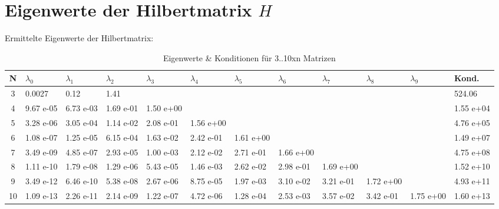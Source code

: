 \documentclass{beamer}
\begin{document}
  \section{Eigenwerte der Hilbertmatrix $H$}
  \begin{frame}
    Ermittelte Eigenwerte der Hilbertmatrix:
    \centering    
    \begin{table}[htbp]
    \tiny   
    \begin{tabularx}{\textwidth}{|c|X|X|X|X|X|X|X|X|X|X|X|}
        \hline    
        N & $\lambda_0$&$\lambda_1$&$\lambda_2$&$\lambda_3$&$\lambda_4$&$\lambda_5$&$\lambda_6$&$\lambda_7$&$\lambda_8$&$\lambda_9$& Kond.\\\hline
        3 & 0.0027 & 0.12 & 1.41 &&&&&&&& 524.06\\\hline
        4 & 9.67 e-05 & 6.73 e-03 & 1.69 e-01 & 1.50 e+00 &&&&&&& 1.55 e+04\\\hline
        5 & 3.28 e-06 & 3.05 e-04 & 1.14 e-02 & 2.08 e-01 & 1.56 e+00 &&&&&& 4.76 e+05\\\hline
        6 & 1.08 e-07 & 1.25 e-05 & 6.15 e-04 & 1.63 e-02 & 2.42 e-01 & 1.61 e+00 &&&&& 1.49 e+07\\\hline
        7 & 3.49 e-09 & 4.85 e-07 & 2.93 e-05 & 1.00 e-03 & 2.12 e-02 & 2.71 e-01 & 1.66 e+00 &&&& 4.75 e+08\\\hline
        8 & 1.11 e-10 & 1.79 e-08 & 1.29 e-06 & 5.43 e-05 & 1.46 e-03 & 2.62 e-02 & 2.98 e-01 & 1.69 e+00 &&& 1.52 e+10\\\hline
        9 & 3.49 e-12 & 6.46 e-10 & 5.38 e-08 & 2.67 e-06 & 8.75 e-05 & 1.97 e-03 & 3.10 e-02 & 3.21 e-01 & 1.72 e+00 && 4.93 e+11\\\hline
        10& 1.09 e-13 & 2.26 e-11 & 2.14 e-09 & 1.22 e-07 & 4.72 e-06 & 1.28 e-04 & 2.53 e-03 & 3.57 e-02 & 3.42 e-01 & 1.75 e+00 & 1.60 e+13\\\hline
    \end{tabularx}
    \caption{Eigenwerte \& Konditionen für 3..10xn Matrizen \label{tab:task3}}      
    \end{table}
  \end{frame}
  
\end{document}
